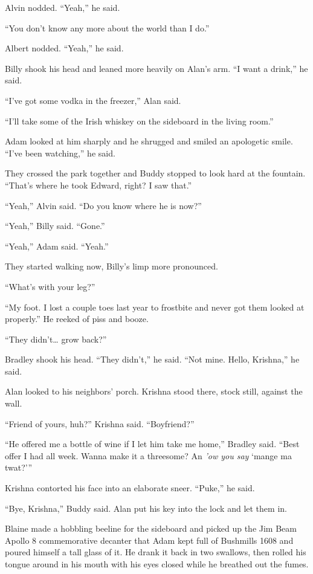 Alvin nodded.  ``Yeah,'' he said.

``You don't know any more about the world than I do.''

Albert nodded.  ``Yeah,'' he said.

Billy shook his head and leaned more heavily on Alan's arm.  ``I want
a drink,'' he said.

``I've got some vodka in the freezer,'' Alan said.

``I'll take some of the Irish whiskey on the sideboard in the living
room.''

Adam looked at him sharply and he shrugged and smiled an apologetic
smile.  ``I've been watching,'' he said.

They crossed the park together and Buddy stopped to look hard at the
fountain.  ``That's where he took Edward, right?  I saw that.''

``Yeah,'' Alvin said.  ``Do you know where he is now?''

``Yeah,'' Billy said.  ``Gone.''

``Yeah,'' Adam said.  ``Yeah.''

They started walking now, Billy's limp more pronounced.

``What's with your leg?''

``My foot.  I lost a couple toes last year to frostbite and never got
them looked at properly.'' He reeked of piss and booze.

``They didn't\ldots{}  grow back?''

Bradley shook his head.  ``They didn't,'' he said.  ``Not mine. 
Hello, Krishna,'' he said.

Alan looked to his neighbors' porch.  Krishna stood there, stock
still, against the wall.

``Friend of yours, huh?'' Krishna said.  ``Boyfriend?''

``He offered me a bottle of wine if I let him take me home,'' Bradley
said.  ``Best offer I had all week.  Wanna make it a threesome?  An
\textit{'ow you say} `mange ma twat?'''

Krishna contorted his face into an elaborate sneer.  ``Puke,'' he
said.

``Bye, Krishna,'' Buddy said.  Alan put his key into the lock and let
them in.

Blaine made a hobbling beeline for the sideboard and picked up the Jim
Beam Apollo 8 commemorative decanter that Adam kept full of Bushmills
1608 and poured himself a tall glass of it.  He drank it back in two
swallows, then rolled his tongue around in his mouth with his eyes
closed while he breathed out the fumes.

